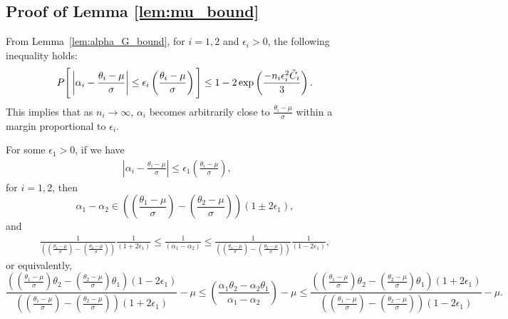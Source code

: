 \documentclass[10pt]{article} %
\theoremstyle{plain}
\theoremstyle{definition}
\theoremstyle{remark}
\begin{document}
\subsection{Proof of Lemma \ref{lem:mu_bound}}
From Lemma~\ref{lem:alpha_G_bound}, for \(i = 1, 2\) and \(\epsilon_i > 0\), the following inequality holds:
\begin{align*}
P \Bigg[ \left| \alpha_i - \frac{\theta_i - \mu}{\sigma} \right| \leq \epsilon_i \left( \frac{\theta_i - \mu}{\sigma} \right) \Bigg] \leq 1 - 2\exp \left( \frac{-n_i \epsilon_i^2 \Tilde{C}_i}{3} \right).
\end{align*}
This implies that as \(n_i \to \infty\), \(\alpha_i\) becomes arbitrarily close to \(\frac{\theta_i - \mu}{\sigma}\) within a margin proportional to \(\epsilon_i\).
\par For some $\epsilon_1>0$, if we have
  \begin{align}
  \left| \alpha_i - \frac{\theta_i - \mu}{\sigma} \right| \leq \epsilon_1 \left( \frac{\theta_i - \mu}{\sigma} \right), &&\label{eq:condn_alpha1minusalpha2}
 \end{align}
for $i=1,2$, then
\[
     \alpha_1 - \alpha_2 \in \left(   \left(  \frac{\theta_1 - \mu}{\sigma} \right) - \left(  \frac{\theta_2 - \mu}{\sigma} \right) \right) (1 \pm 2\epsilon_1),
\]
and
\begin{align}
 \frac{1}{\left (  \left(  \frac{\theta_1 - \mu}{\sigma} \right) - \left(  \frac{\theta_2 - \mu}{\sigma} \right) \right ) } \frac{1}{\left(  1 + 2\epsilon_1 \right)} \leq  \frac{1}{\left( \alpha_1 - \alpha_2 \right)} \leq \frac{1}{  \left( \left(  \frac{\theta_1 - \mu}{\sigma} \right) - \left(  \frac{\theta_2 - \mu}{\sigma} \right)  \right) } \frac{1}{\left(  1 - 2\epsilon_1 \right)}, \label{inversealpha1-alpha2bound}
\end{align}
or equivalently,
\begin{equation}
   \frac{ \left( \left( \frac{\theta_1 - \mu}{\sigma} \right) \theta_2 - \left( \frac{\theta_2 - \mu}{\sigma} \right) \theta_1 \right) (1 - 2 \epsilon_1) }{ \left( \left( \frac{\theta_1 - \mu}{\sigma} \right) - \left( \frac{\theta_2 - \mu}{\sigma} \right) \right) (1 + 2 \epsilon_1)} - \mu  \leq  \left( \frac{\alpha_1\theta_2 - \alpha_2 \theta_1}{ \alpha_1 - \alpha_2} \right) - \mu  \leq \frac{ \left( \left( \frac{\theta_1 - \mu}{\sigma} \right) \theta_2 - \left( \frac{\theta_2 - \mu}{\sigma} \right) \theta_1 \right) (1 + 2 \epsilon_1) }{ \left( \left( \frac{\theta_1 - \mu}{\sigma} \right) - \left( \frac{\theta_2 - \mu}{\sigma} \right) \right) (1 - 2 \epsilon_1)}  - \mu.
\label{epsilon_bound}
\end{equation}
\end{document}
